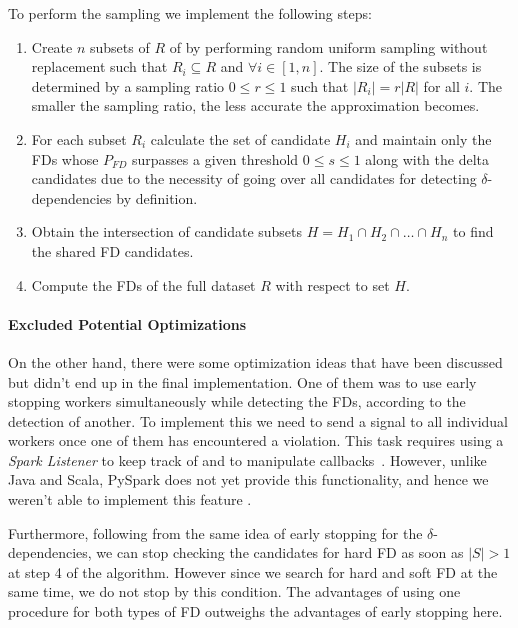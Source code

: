 \documentclass{article}
\begin{document}
        To perform the sampling we implement the following steps:
        
        \begin{enumerate}[noitemsep]
            \item Create $n$ subsets of $R$ of by performing random uniform sampling without replacement such that $R_i \subseteq R$ and $\forall i \in [1,n]$. The size of the subsets is determined by a sampling ratio $0 \leq r \leq 1$ such that $|R_i| = r |R|$ for all $i$. The smaller the sampling ratio, the less accurate the approximation becomes.
            
            \item For each subset $R_i$ calculate the set of candidate $H_i$ and maintain only the FDs whose $P_{FD}$ surpasses a given threshold $0 \leq s \leq 1$ along with the delta candidates due to the necessity of going over all candidates for detecting $\delta$-dependencies by definition.
            
            \item Obtain the intersection of candidate subsets $H = H_1\cap H_2 \cap \ldots \cap H_n$ to find the shared FD candidates.
            
            \item Compute the FDs of the full dataset $R$ with respect to set $H$.
        \end{enumerate}
        
        \paragraph{Excluded Potential Optimizations} 
        
        On the other hand, there were some optimization ideas that have been discussed but didn't end up in the final implementation. One of them was to use early stopping workers simultaneously while detecting the FDs, according to the detection of another. To implement this we need to send a signal to all individual workers once one of them has encountered a violation. This task requires using a \textit{Spark Listener} to keep track of and to manipulate callbacks~\cite{spark_doc}. However, unlike Java and Scala, PySpark does not yet provide this functionality, and hence we weren't able to implement this feature \cite{spark_doc_sched}.
        
        Furthermore, following from the same idea of early stopping  for the $\delta$-dependencies, we can stop checking the candidates for hard FD as soon as $|S| > 1$ at step 4 of the algorithm. However since we search for hard and soft FD at the same time, we do not stop by this condition. The advantages of using one procedure for both types of FD outweighs the advantages of early stopping here.
        
\end{document}
